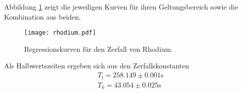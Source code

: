 Abbildung \ref{fig:regress} zeigt die jeweiligen Kurven für ihren Geltungsbereich sowie die Kombination aus beiden.

\begin{figure}
 \centering
 \texttt{[image: rhodium.pdf]}
 \caption{Regressionskurven für den Zerfall von Rhodium.}
 \label{fig:regress}
\end{figure}

\noindent Als Halbwertszeiten ergeben sich aus den Zerfallskonstanten
\begin{align}
    T_l = 258.149 \pm 0.001 \si{\s} \\
    T_k = 43.054 \pm 0.025 \si{\s}\\
\end{align}